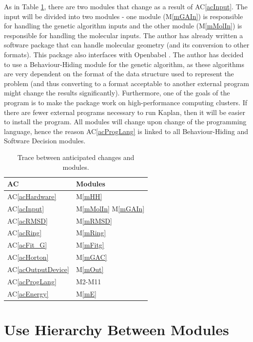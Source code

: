 \documentclass[12pt, titlepage]{article}
\newcommand{\acref}[1]{AC\ref{#1}}
\newcommand{\mref}[1]{M\ref{#1}}
\newcommand{\progname}{Kaplan} %
\begin{document}
As in Table \ref{trace-ACM}, there are two modules that change as a result of 
\acref{acInput}. The input will be divided into two modules - one module 
(\mref{mGAIn}) is responsible for handling the genetic algorithm inputs and the 
other module (\mref{mMolIn}) is responsible for handling the molecular inputs. 
The author has already written a software package that can handle molecular 
geometry (and its conversion to other formats). This package also interfaces 
with Openbabel \cite{obabel}. The author has decided to use a Behaviour-Hiding 
module for the genetic algorithm, as these algorithms are very dependent on the 
format of the data structure used to represent the problem (and thus converting 
to a format acceptable to another external program might change the results 
significantly). Furthermore, one of the goals of the program is to make the 
package work on high-performance computing clusters. If there are fewer 
external programs necessary to run \progname{}, then it will be easier to 
install the program. All modules will change upon change of the programming 
language, hence the reason \acref{acProgLang} is linked to all Behaviour-Hiding 
and Software Decision modules.

\begin{table}[H]
\centering
\begin{tabular}{p{} p{}}
\toprule
\textbf{AC} & \textbf{Modules}\\
\midrule
\acref{acHardware} & \mref{mHH}\\
\acref{acInput} & \mref{mMolIn} \mref{mGAIn} \\
\acref{acRMSD} & \mref{mRMSD} \\
\acref{acRing} & \mref{mRing} \\
\acref{acFit_G} & \mref{mFitg} \\
\acref{acHorton} & \mref{mGAC} \\
\acref{acOutputDevice} & \mref{mOut} \\
\acref{acProgLang} & M2-M11 \\
\acref{acEnergy} & \mref{mE} \\
\bottomrule
\end{tabular}
\caption{Trace between anticipated changes and modules.}
\label{trace-ACM}
\end{table}

\section{Use Hierarchy Between Modules} \label{SecUse}
\end{document}
